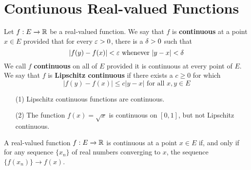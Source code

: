 \section{Contiunous Real-valued Functions}

\begin{definition}
    Let $f:E \xrightarrow{} \mathbb{R}$ be a real-valued function. We say that $f$ is
     \textbf{continuous} at a point $x \in E$ provided that for every  $\varepsilon>0$,
     there is a  $\delta>0$ such that
     \begin{equation*}
         |f(y)-f(x)|<\varepsilon \text{ whenever } |y-x|<\delta
     \end{equation*}
     We call $f$  \textbf{continuous} on all of $E$ provided it is continuous at
     every point of  $E$. We say that  $f$ is  \textbf{Lipschitz continuous} if
     there exists a $c \geq 0$ for which
     \begin{equation*}
         |f(y)-f(x)| \leq c|y-x| \text{ for all } x,y \in E
     \end{equation*}
\end{definition}

\begin{example}\label{example_1.3}
    \begin{enumerate}
        \item[(1)] Lipschitz continuous functions are continuous.

        \item[(2)] The function $f(x)=\sqrt{x}$ is continuous on $[0,1]$, but
            not Lipschitz continuous.
    \end{enumerate}
\end{example}

\begin{lemma}\label{1.4.1}
    A real-valued function $f:E \xrightarrow{} \mathbb{R}$ is continuous at a point $x
    \in E$ if, and only if for any sequence $\{x_n\}$ of real numbers converging
    to $x$, the sequence  $\{f(x_n)\} \xrightarrow{} f(x)$.
\end{lemma}

